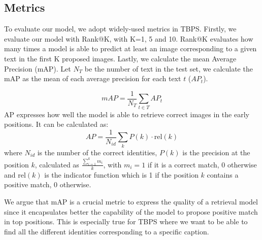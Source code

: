 \documentclass[acmsmall]{acmart}
\begin{document}
\subsection{Metrics}
To evaluate our model, we adopt widely-used metrics in TBPS. Firstly, we evaluate our model with Rank@K, with K=1, 5 and 10. Rank@K evaluates how many times a model is able to predict at least an image corresponding to a given text in the first K proposed images. Lastly, we calculate the mean Average Precision (mAP). Let $N_T$ be the number of text in the test set, we calculate the mAP as the mean of each average precision for each text $t$ ($AP_t$).

\begin{equation}
    mAP=\frac{1}{N_{T}}\sum_{t\in T}AP_t
\end{equation}
AP expresses how well the model is able to retrieve correct images in the early positions. It can be calculated as:
\begin{equation}
    AP=\frac{1}{N_{id}}\sum_{k} P(k)\cdot \mathrm{rel}(k)
\end{equation}
where $N_{id}$ is the number of the correct identities, $P(k)$ is the precision at the position $k$, calculated as $\frac{\sum_{i=1}^k m_i}{k}$, with $m_i=1$ if it is a correct match, 0 otherwise and $\mathrm{rel}(k)$ is the indicator function which is 1 if the position $k$ contains a positive match, $0$ otherwise.

We argue that mAP is a crucial metric to express the quality of a retrieval model since it encapsulates better the capability of the model to propose positive match in top positions. This is especially true for TBPS where we want to be able to find all the different identities corresponding to a specific caption.
\end{document}
